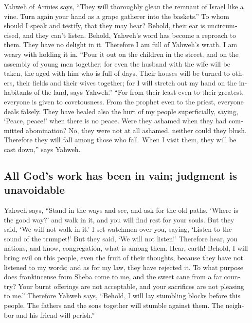 \begin{paracol}{2}
\begin{otherlanguage}{english}
 Yahweh of Armies says, ``They will thoroughly glean the
remnant of Israel like a vine. Turn again your hand as a grape gatherer
into the baskets.''  To whom should I speak and testify,
that they may hear? Behold, their ear is uncircumcised, and they can't
listen. Behold, Yahweh's word has become a reproach to them. They have
no delight in it.  Therefore I am full of Yahweh's wrath.
I am weary with holding it in. ``Pour it out on the children in the
street, and on the assembly of young men together; for even the husband
with the wife will be taken, the aged with him who is full of days.
 Their houses will be turned to others, their fields and
their wives together; for I will stretch out my hand on the inhabitants
of the land, says Yahweh.''  ``For from their least even
to their greatest, everyone is given to covetousness. From the prophet
even to the priest, everyone deals falsely.  They have
healed also the hurt of my people superficially, saying, `Peace, peace!'
when there is no peace.  Were they ashamed when they had
committed abomination? No, they were not at all ashamed, neither could
they blush. Therefore they will fall among those who fall. When I visit
them, they will be cast down,'' says Yahweh.

\hypertarget{all-gods-work-has-been-in-vain-judgment-is-unavoidable}{%
\subsection{All God's work has been in vain; judgment is
unavoidable}\label{all-gods-work-has-been-in-vain-judgment-is-unavoidable}}

 Yahweh says, ``Stand in the ways and see, and ask for
the old paths, `Where is the good way?' and walk in it, and you will
find rest for your souls. But they said, `We will not walk in it.'
 I set watchmen over you, saying, `Listen to the sound of
the trumpet!' But they said, `We will not listen!' 
Therefore hear, you nations, and know, congregation, what is among them.
 Hear, earth! Behold, I will bring evil on this people,
even the fruit of their thoughts, because they have not listened to my
words; and as for my law, they have rejected it.  To what
purpose does frankincense from Sheba come to me, and the sweet cane from
a far country? Your burnt offerings are not acceptable, and your
sacrifices are not pleasing to me.''  Therefore Yahweh
says, ``Behold, I will lay stumbling blocks before this people. The
fathers and the sons together will stumble against them. The neighbor
and his friend will perish.''


\end{otherlanguage}
\end{paracol}
